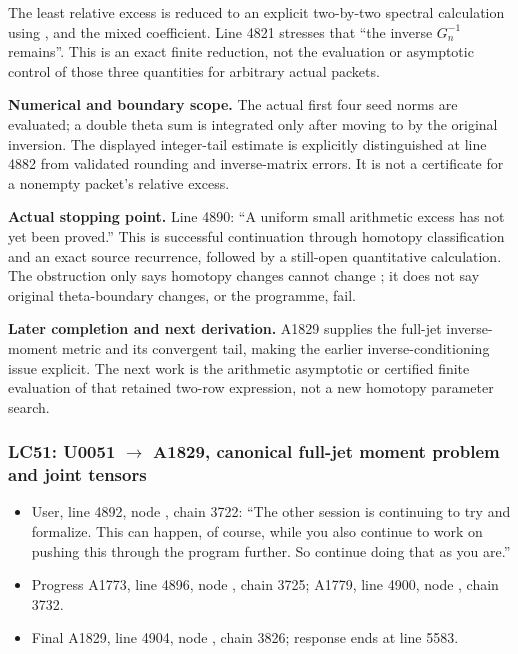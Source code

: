 The least relative excess is reduced to an explicit two-by-two spectral
calculation using \protect{},
\protect{} and the mixed coefficient. Line
4821 stresses that ``the inverse \(G_n^{-1}\) remains''. This is an
exact finite reduction, not the evaluation or asymptotic control of
those three quantities for arbitrary actual packets.

\textbf{Numerical and boundary scope.} The actual first four seed norms
are evaluated; a double theta sum is integrated only after moving
\protect{} to \protect{} by the original
inversion. The displayed integer-tail estimate is explicitly
distinguished at line 4882 from validated rounding and inverse-matrix
errors. It is not a certificate for a nonempty packet's relative excess.

\textbf{Actual stopping point.} Line 4890: ``A uniform small arithmetic
excess has not yet been proved.'' This is successful continuation
through homotopy classification and an exact source recurrence, followed
by a still-open quantitative calculation. The obstruction only says
homotopy changes cannot change \protect{}; it does not say
original theta-boundary changes, or the programme, fail.

\textbf{Later completion and next derivation.} A1829 supplies the
full-jet inverse-moment metric and its convergent tail, making the
earlier inverse-conditioning issue explicit. The next work is the
arithmetic asymptotic or certified finite evaluation of that retained
two-row expression, not a new homotopy parameter search.

\subsubsection{\texorpdfstring{LC51: U0051
\allowbreak{}\ensuremath{→}\allowbreak{} A1829, canonical full-jet
moment problem and joint
tensors}{LC51: U0051  A1829, canonical full-jet moment problem and joint tensors}}\label{TranscriptLedgerStage:lc51-u0051-a1829-canonical-full-jet-moment-problem-and-joint-tensors}

\begin{itemize}
\tightlist
\item
  User, line 4892, node
  \protect{}, chain 3722: ``The
  other session is continuing to try and formalize. This can happen, of
  course, while you also continue to work on pushing this through the
  program further. So continue doing that as you are.''
\item
  Progress A1773, line 4896, node
  \protect{}, chain 3725;
  A1779, line 4900, node
  \protect{}, chain 3732.
\item
  Final A1829, line 4904, node
  \protect{}, chain 3826;
  response ends at line 5583.
\end{itemize}

